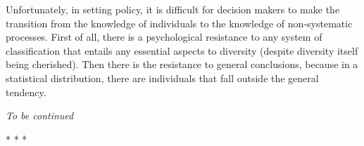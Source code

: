 Unfortunately, in setting policy, it is difficult for decision makers to make the transition from the knowledge of individuals to the knowledge of non-systematic processes. First of all, there is a psychological resistance to any system of classification that entails any essential aspects to diversity (despite diversity itself being cherished). Then there is the resistance to general conclusions, because in a statistical distribution, there are individuals that fall outside the general tendency.


\hfill

\emph{To be continued}


\begin{center}* * *\end{center}

